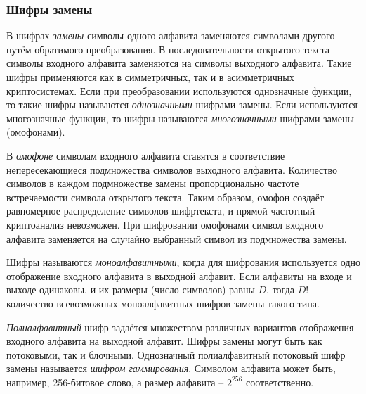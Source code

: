 \subsubsection{Шифры замены}

В шифрах \emph{замены} символы одного алфавита заменяются символами другого путём обратимого преобразования. В последовательности открытого текста символы входного алфавита заменяются на символы выходного алфавита. Такие шифры применяются как в симметричных, так и в асимметричных криптосистемах. Если при преобразовании используются однозначные функции, то такие шифры называются \emph{однозначными} шифрами замены. Если используются многозначные функции, то шифры называются \emph{многозначными} шифрами замены (омофонами).

В \emph{омофоне} символам входного алфавита ставятся в соответствие непересекающиеся подмножества символов выходного алфавита. Количество символов в каждом подмножестве замены пропорционально частоте встречаемости символа открытого текста. Таким образом, омофон создаёт равномерное распределение символов шифртекста, и прямой частотный криптоанализ невозможен. При шифровании омофонами символ входного алфавита заменяется на случайно выбранный символ из подмножества замены.

Шифры называются \emph{моноалфавитными}, когда для шифрования используется одно отображение входного алфавита в выходной алфавит. Если алфавиты на входе и выходе одинаковы, и их размеры (число символов) равны $D$, тогда $D!$ -- количество всевозможных моноалфавитных шифров замены такого типа.

\emph{Полиалфавитный} шифр задаётся множеством различных вариантов отображения входного алфавита на выходной алфавит. Шифры замены могут быть как потоковыми, так и блочными. Однозначный полиалфавитный потоковый шифр замены называется \emph{шифром гаммирования}. Символом алфавита может быть, например, 256-битовое слово, а размер алфавита -- $2^{256}$ соответственно.
